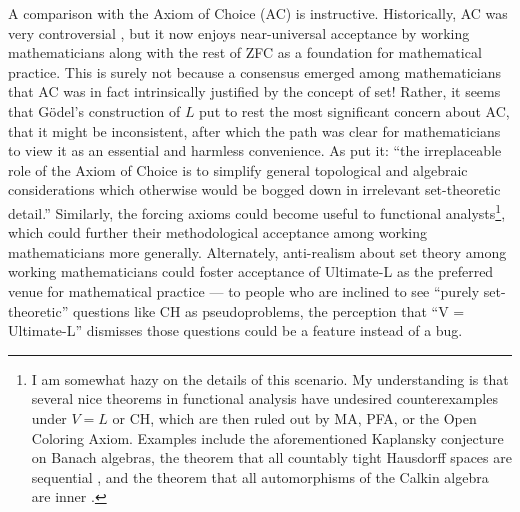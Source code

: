 \documentclass[letterpaper,12pt]{article}
\begin{document}
A comparison with the Axiom of Choice (AC) is instructive. Historically, AC was very controversial \citep{sep-axiom-choice}, but it now enjoys near-universal acceptance by working mathematicians along with the rest of ZFC as a foundation for mathematical practice. This is surely not because a consensus emerged among mathematicians that AC was in fact intrinsically justified by the concept of set! Rather, it seems that G\"odel's construction of $L$ put to rest the most significant concern about AC, that it might be inconsistent, after which the path was clear for mathematicians to view it as an essential and harmless convenience. As \cite{hrbacek1999introduction} put it: ``the irreplaceable role of the Axiom of Choice is to simplify general topological and algebraic considerations which otherwise would be bogged down in irrelevant set-theoretic detail.'' Similarly, the forcing axioms could become useful to functional analysts\footnote{I am somewhat hazy on the details of this scenario. My understanding is that several nice theorems in functional analysis have undesired counterexamples under $V = L$ or CH, which are then ruled out by MA, PFA, or the Open Coloring Axiom. Examples include the aforementioned Kaplansky conjecture on Banach algebras, the theorem that all countably tight Hausdorff spaces are sequential \citep{balogh1988countable}, and the theorem that all automorphisms of the Calkin algebra are inner \citep{farah2011all}.}, which could further their methodological acceptance among working mathematicians more generally. Alternately, anti-realism about set theory among working mathematicians could foster acceptance of Ultimate-L as the preferred venue for mathematical practice --- to people who are inclined to see ``purely set-theoretic'' questions like CH as pseudoproblems, the perception that ``V = Ultimate-L'' dismisses those questions could be a feature instead of a bug.
\end{document}

